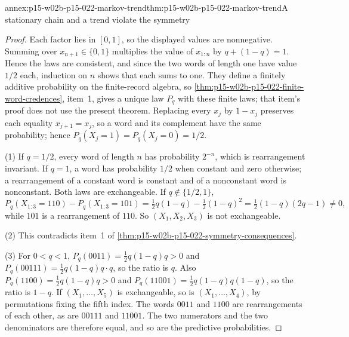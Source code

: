 \begin{annexitem}{annex:p15-w02b-p15-022-markov-trend}{thm:p15-w02b-p15-022-markov-trend}{A stationary chain and a trend violate the symmetry}
\begin{proof}
Each factor lies in \([0,1]\), so the displayed values are nonnegative.
Summing over \(x_{n+1}\in\{0,1\}\) multiplies the value of
\(x_{1:n}\) by \(q+(1-q)=1\). Hence the laws are consistent, and since the
two words of length one have value \(1/2\) each, induction on \(n\) shows
that each sums to one. They define a finitely additive probability on the
finite-record algebra, so \cref{thm:p15-w02b-p15-022-finite-word-credences},
item~1, gives a unique law \(P_q\) with these finite laws; that item's proof
does not use the present theorem. Replacing every \(x_j\) by \(1-x_j\)
preserves each equality \(x_{j+1}=x_j\), so a word and its complement have
the same probability; hence \(P_q(X_j=1)=P_q(X_j=0)=1/2\).

(1) If \(q=1/2\), every word of length \(n\) has probability \(2^{-n}\),
which is rearrangement invariant. If \(q=1\), a word has probability
\(1/2\) when constant and zero otherwise; a rearrangement of a constant word
is constant and of a nonconstant word is nonconstant. Both laws are
exchangeable. If \(q\notin\{1/2,1\}\),
\[
 P_q(X_{1:3}=110)-P_q(X_{1:3}=101)
   =\tfrac12q(1-q)-\tfrac12(1-q)^2=\tfrac12(1-q)(2q-1)\neq0,
\]
while \(101\) is a rearrangement of \(110\). So \((X_1,X_2,X_3)\) is not
exchangeable.

(2) This contradicts item~1 of
\cref{thm:p15-w02b-p15-022-symmetry-consequences}.

(3) For \(0<q<1\),
\(P_q(0011)=\tfrac12q(1-q)q>0\) and \(P_q(00111)=\tfrac12q(1-q)q\cdot q\),
so the ratio is \(q\). Also \(P_q(1100)=\tfrac12q(1-q)q>0\) and
\(P_q(11001)=\tfrac12q(1-q)q(1-q)\), so the ratio is \(1-q\).
If \((X_1,\ldots,X_5)\) is exchangeable, so is \((X_1,\ldots,X_4)\), by
permutations fixing the fifth index. The words \(0011\) and \(1100\) are
rearrangements of each other, as are \(00111\) and \(11001\). The two
numerators and the two denominators are therefore equal, and so are the
predictive probabilities.
\end{proof}
\end{annexitem}

